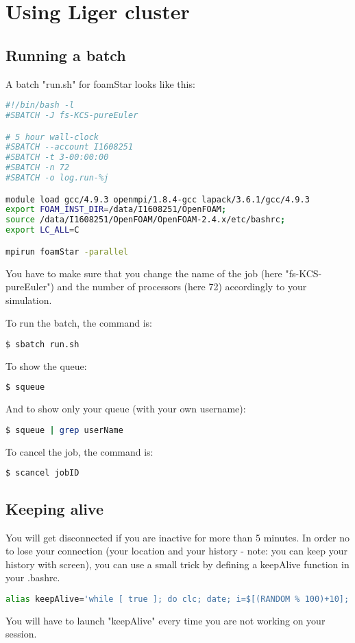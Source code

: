 \chapter{Using Liger cluster}


\section{Running a batch}

A batch "run.sh" for foamStar looks like this:
\begin{lstlisting}[language=bash]
#!/bin/bash -l
#SBATCH -J fs-KCS-pureEuler

# 5 hour wall-clock 
#SBATCH --account I1608251
#SBATCH -t 3-00:00:00
#SBATCH -n 72
#SBATCH -o log.run-%j

module load gcc/4.9.3 openmpi/1.8.4-gcc lapack/3.6.1/gcc/4.9.3
export FOAM_INST_DIR=/data/I1608251/OpenFOAM;
source /data/I1608251/OpenFOAM/OpenFOAM-2.4.x/etc/bashrc;
export LC_ALL=C

mpirun foamStar -parallel
\end{lstlisting}
You have to make sure that you change the name of the job (here "fs-KCS-pureEuler") and the number of processors (here 72) accordingly to your simulation.

To run the batch, the command is:
\begin{lstlisting}[language=bash]
  $ sbatch run.sh
\end{lstlisting}


To show the queue:
\begin{lstlisting}[language=bash]
  $ squeue
\end{lstlisting}

And to show only your queue (with your own username):
\begin{lstlisting}[language=bash]
  $ squeue | grep userName
\end{lstlisting}


To cancel the job, the command is:
\begin{lstlisting}[language=bash]
  $ scancel jobID
\end{lstlisting}


\section{Keeping alive}

You will get disconnected if you are inactive for more than 5 minutes. In order no to lose your connection (your location and your history - note: you can keep your history with screen), you can use a small trick by defining a keepAlive function in your .bashrc.


\begin{lstlisting}[language=bash]
alias keepAlive='while [ true ]; do clc; date; i=$[(RANDOM % 100)+10]; sleep $i; done'
\end{lstlisting}

You will have to launch "keepAlive" every time you are not working on your session.
